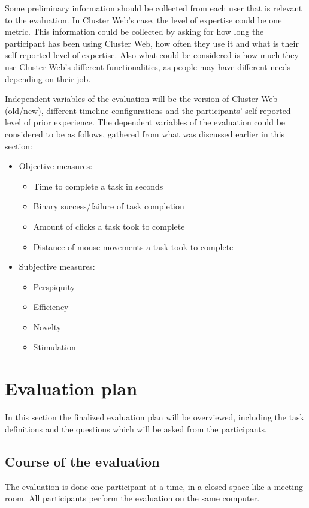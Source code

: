 Some preliminary information should be collected from each user that is relevant to the evaluation. In Cluster Web's case, the level of expertise could be one metric. This information could be collected by asking for how long the participant has been using Cluster Web, how often they use it and what is their self-reported level of expertise. Also what could be considered is how much they use Cluster Web's different functionalities, as people may have different needs depending on their job.

Independent variables of the evaluation will be the version of Cluster Web (old/new), different timeline configurations and the participants' self-reported level of prior experience. The dependent variables of the evaluation could be considered to be as follows, gathered from what was discussed earlier in this section:

\begin{itemize}
\item Objective measures:
\begin{itemize}
\item Time to complete a task in seconds
\item Binary success/failure of task completion
\item Amount of clicks a task took to complete
\item Distance of mouse movements a task took to complete
\end{itemize}
\item Subjective measures:
\begin{itemize}
\item Perspiquity
\item Efficiency
\item Novelty
\item Stimulation
\end{itemize}
\end{itemize}

\section{Evaluation plan}
In this section the finalized evaluation plan will be overviewed, including the task definitions and the questions which will be asked from the participants.

\subsection{Course of the evaluation}
The evaluation is done one participant at a time, in a closed space like a meeting room. All participants perform the evaluation on the same computer.

